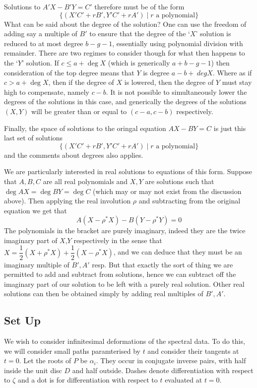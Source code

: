 Solutions to $A'X - B'Y = C'$ therefore must be of the form
\[
\{(X'C' + rB', Y'C' + rA') \mid r \text{ a polynomial} \}
\]
What can be said about the degree of the solution? One can use the freedom of adding say a multiple of $B'$ to ensure that the degree of the `$X$' solution is reduced to at most degree $b-g-1$, essentially using polynomial division with remainder. There are two regimes to consider though for what then happens to the `$Y$' solution. If $c \leq a + \deg X$ (which is generically $a+b-g-1$) then consideration of the top degree means that $Y$ is degree $a-b +\ deg X$. Where as if $c > a + \deg X$, then if the degree of $X$ is lowered, then the degree of $Y$ must stay high to compensate, namely $c-b$. It is not possible to simultaneously lower the degrees of the solutions in this case, and generically the degrees of the solutions $(X,Y)$ will be greater than or equal to $(c-a,c-b)$ respectively.

Finally, the space of solutions to the oringal equation $AX-BY=C$ is just this last set of solutions
\[
\{(X'C' + rB', Y'C' + rA') \mid r \text{ a polynomial} \}
\]
and the comments about degrees also applies.

We are particularly interested in real solutions to equations of this form. Suppose that $A,B,C$ are all real polynomials and $X,Y$ are solutions such that $\deg AX = \deg BY = \deg C$ (which may or may not exist from the discussion above). Then applying the real involution $ρ$ and subtracting from the original equation we get that
\[
A(X-ρ^*X) - B(Y-ρ^*Y) = 0
\]
The polynomials in the bracket are purely imaginary, indeed they are the twice imaginary part of $X$,$Y$ respectively in the sense that $X = \dfrac{1}{2}(X+ρ^*X) + \dfrac{1}{2}(X-ρ^*X)$, and we can deduce that they must be an imaginary multiple of $B',A'$ resp. But that exactly the sort of thing we are permitted to add and subtract from solutions, hence we can subtract off the imaginary part of our solution to be left with a purely real solution. Other real solutions can then be obtained simply by adding real multiples of $B',A'$.






















\subsection{Set Up}
We wish to consider infinitesimal deformations of the spectral data. To do this, we will consider small paths paramterised by $t$ and consider their tangents at $t=0$. Let the roots of $P$ be $\alpha_i$. They occur in conjugate inverse pairs, with half inside the unit disc $D$ and half outside. Dashes denote differentiation with respect to $\zeta$ and a dot is for differentiation with respect to $t$ evaluated at $t=0$.

